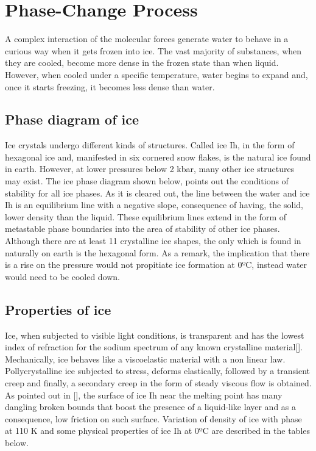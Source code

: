 
\section{Phase-Change Process}
A complex interaction of the molecular forces generate water to behave in a curious way when it gets frozen into ice. The vast majority of substances, when they are cooled, become more dense in the frozen state than when liquid. However, when cooled under a specific temperature, water begins to expand and, once it starts freezing, it becomes less dense than water. 
\newline
\subsection{Phase diagram of ice}
Ice crystals undergo different kinds of structures. Called ice Ih, in the form of hexagonal ice and, manifested in six cornered snow flakes, is the natural ice found in earth. However, at lower pressures below 2 kbar, many other ice structures may exist.
\newline
The ice phase diagram shown below, points out the conditions of stability for all ice phases. As it is cleared out, the line between the water and ice Ih is an equilibrium line with a negative slope, consequence of having, the solid, lower density than the liquid. These equilibrium lines extend in the form of metastable phase boundaries into the area of stability of other ice phases.
Although there are at least 11 crystalline ice shapes, the only which is found in naturally on earth is the hexagonal form. 
\newline
As a remark, the implication that there is a rise on the pressure would not propitiate ice formation at 0ºC, instead water would need to be cooled down.
\subsection{Properties of ice}
Ice, when subjected to visible light conditions, is transparent and has the lowest index of refraction for the sodium spectrum of any known crystalline material[].
\newline
Mechanically, ice behaves like a viscoelastic material with a non linear law. Pollycrystalline ice subjected to stress, deforms elastically, followed by a transient creep and finally, a secondary creep in the form of steady viscous flow is obtained.
\newline
As pointed out in [], the surface of ice Ih near the melting point has many dangling broken bounds that boost the presence of a liquid-like layer and as a consequence, low friction on such surface. Variation of density of ice with phase at 110 K and some physical properties of ice Ih at 0ºC are described in the tables below.
\newline

